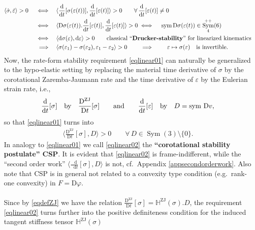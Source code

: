 \documentclass[10pt]{article}
\numberwithin{theoremCounter}{section}
\theoremstyle{plain}
\theoremstyle{definition}
\newcommand{\DD}{\mathrm{D}}
\newcommand*\dif{\mathop{}\!\mathrm{d}}
\DeclareMathOperator{\Sym}{Sym}
\DeclareMathOperator{\sym}{sym}
\DeclareMathOperator{\ZJ}{ZJ}
\def\H{\mathbb{H}}
\numberwithin{equation}{section}
\begin{document}
	\begin{equation}
	\label{eqdrucker}
	\begin{alignedat}{2}
	\langle \dot \sigma, \dot \varepsilon \rangle > 0
	\quad\iff&\quad
	\langle \frac{\dif}{\dif t}[\sigma(\varepsilon(t))], \frac{\dif}{\dif t}[\varepsilon(t)] \rangle > 0 \qquad \forall \, \frac{\dif}{\dif t}[\varepsilon(t)] \neq 0
	 \\
	\iff& \quad \langle \DD \sigma(\varepsilon(t)). \frac{\dif}{\dif t}[\varepsilon(t)], \frac{\dif}{\dif t}[\varepsilon(t)] \rangle > 0 
	\iff \quad \sym \DD \sigma(\varepsilon(t)) \in \Sym^{++}_4(6) \\
	\iff& \quad \langle \dif \sigma(\varepsilon), \dif \varepsilon \rangle > 0 \qquad \textnormal{classical ``\textbf{Drucker-stability}'' for linearized kinematics} \\
	\implies& \quad \langle \sigma(\varepsilon_1) - \sigma(\varepsilon_2), \varepsilon_1 - \varepsilon_2 \rangle > 0 \qquad \implies \qquad  \varepsilon \mapsto \sigma(\varepsilon) \quad \textnormal{is invertible.}
	\end{alignedat}
	\end{equation}
Now, the rate-form stability requirement \eqref{eqlinear01} can naturally be generalized to the hypo-elastic setting by replacing the material time derivative of $\sigma$ by the corotational Zaremba-Jaumann rate and the time derivative of $\varepsilon$ by the Eulerian strain rate, i.e.,
	\begin{align}
	\frac{\dif}{\dif t}[\sigma] \quad \textnormal{by} \quad \frac{\DD^{\ZJ}}{\DD t}[\sigma] \qquad \textnormal{and} \qquad \frac{\dif}{\dif t}[\varepsilon] \quad \textnormal{by} \quad D = \sym \, \DD v,
	\end{align}
so that \eqref{eqlinear01} turns into
	\begin{align}
	\label{eqlinear02}
	\langle \frac{\DD^{\ZJ}}{\DD t}[\sigma], D \rangle > 0 \qquad \forall \, D \in \Sym(3) \! \setminus \! \{0\}.
	\end{align}
In analogy to \eqref{eqlinear01} we call \eqref{eqlinear02} the \textbf{``corotational stability postulate'' CSP}. It is evident that \eqref{eqlinear02} is frame-indifferent, while the ``second order work'' $\langle \frac{\dif}{\dif t}[\sigma],D \rangle$ is not, cf.~Appendix \ref{appsecondorderwork}. Also note that CSP is in general not related to a convexity type condition (e.g.~rank-one convexity) in $F = \DD \varphi$. \\
\\
Since by \eqref{eqdefZJ} we have the relation $\frac{\DD^{\ZJ}}{\DD t}[\sigma] = \H^{\ZJ}(\sigma).D$, the requirement \eqref{eqlinear02} turns further into the positive definiteness condition for the induced tangent stiffness tensor $\H^{\ZJ}(\sigma)$
\end{document}
